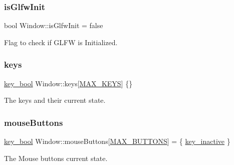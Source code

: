 \mbox{\label{class_window_aaeb459aaf4e4f822bb7411d557312328}} 
\subsubsection{\texorpdfstring{is\+Glfw\+Init}{isGlfwInit}}
{\footnotesize\ttfamily bool Window\+::is\+Glfw\+Init = false\hspace{0.3cm}{\ttfamily [protected]}}



Flag to check if G\+L\+FW is Initialized. 

\mbox{\label{class_window_a7e9389c2d0e9f90f10422f86be7d22d8}} 
\subsubsection{\texorpdfstring{keys}{keys}}
{\footnotesize\ttfamily \mbox{\hyperlink{_window_8h_a793ae82d7efec9490f81b4595e03b6f2}{key\+\_\+bool}} Window\+::keys\mbox{[}\mbox{\hyperlink{_window_8h_a3077ecca3770bdee50e6a17dfb55d002}{M\+A\+X\+\_\+\+K\+E\+YS}}\mbox{]} \{\}}



The keys and their current state. 

\mbox{\label{class_window_af219ad727d87f6f2d0d34c0d165ec065}} 
\subsubsection{\texorpdfstring{mouse\+Buttons}{mouseButtons}}
{\footnotesize\ttfamily \mbox{\hyperlink{_window_8h_a793ae82d7efec9490f81b4595e03b6f2}{key\+\_\+bool}} Window\+::mouse\+Buttons\mbox{[}\mbox{\hyperlink{_window_8h_a8bb0c7f312bb8665c3377a061dae552c}{M\+A\+X\+\_\+\+B\+U\+T\+T\+O\+NS}}\mbox{]} = \{ \mbox{\hyperlink{_window_8h_a793ae82d7efec9490f81b4595e03b6f2ab04ef1a66cda34ead7b763a49080d854}{key\+\_\+inactive}} \}}



The Mouse buttons current state. 

\mbox{\label{class_window_a93b50aa557f493c5589af5dcc8f74c4a}} 
